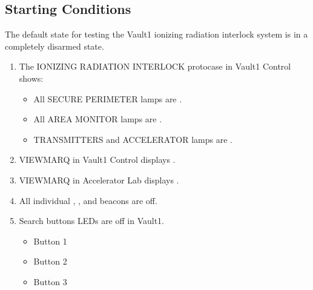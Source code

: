 \documentclass[letterpaper,10pt,english]{sphinxmanual}
\begin{document}
\subsection{Starting Conditions}
\label{\detokenize{testing_documentation/Vault-1_ionizing_radiation:starting-conditions}}
\sphinxAtStartPar
The default state for testing the Vault\sphinxhyphen{}1 ionizing radiation interlock system is in a completely disarmed state.
\begin{enumerate}
%
\item {} 
\sphinxAtStartPar
The IONIZING RADIATION INTERLOCK protocase in Vault\sphinxhyphen{}1 Control shows:
\begin{itemize}
\item {} 
\sphinxAtStartPar
All SECURE PERIMETER lamps are .

\item {} 
\sphinxAtStartPar
All AREA MONITOR lamps are .

\item {} 
\sphinxAtStartPar
TRANSMITTERS and ACCELERATOR lamps are .

\end{itemize}

\item {} 
\sphinxAtStartPar
VIEWMARQ in Vault\sphinxhyphen{}1 Control displays .

\item {} 
\sphinxAtStartPar
VIEWMARQ in Accelerator Lab displays .

\item {} 
\sphinxAtStartPar
All individual , , and  beacons are off.

\item {} 
\sphinxAtStartPar
Search buttons LEDs are off in Vault\sphinxhyphen{}1.
\begin{itemize}
\item {} 
\sphinxAtStartPar
Button 1

\item {} 
\sphinxAtStartPar
Button 2

\item {} 
\sphinxAtStartPar
Button 3

\end{itemize}

\end{enumerate}
\end{document}
